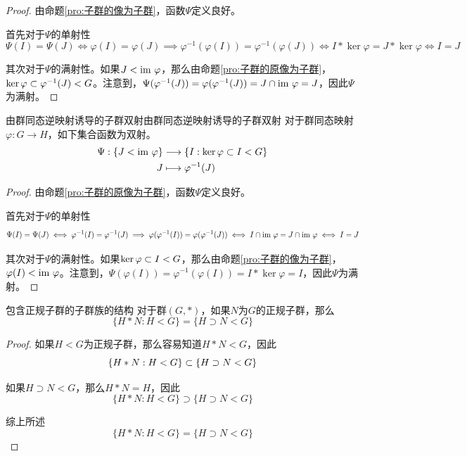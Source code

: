 \begin{proof}
	由命题\ref{pro:子群的像为子群}，函数$\Psi$定义良好。
	
	首先对于$\Psi$的单射性
	$$
	\Psi(I)=\Psi(J)
	\iff \varphi(I)=\varphi(J)
	\implies \varphi^{-1}(\varphi(I))=\varphi^{-1}(\varphi(J))
	\iff I*\ker\varphi=J*\ker\varphi
	\iff I=J
	$$
	
	其次对于$\Psi$的满射性。如果$J<\text{im } \varphi$，那么由命题\ref{pro:子群的原像为子群}，$\ker\varphi\subset \varphi^{-1}(J)<G$。注意到，$\Psi(\varphi^{-1}(J))=\varphi(\varphi^{-1}(J))=J\cap\text{im } \varphi=J$，因此$\Psi$为满射。
\end{proof}

\begin{proposition}{由群同态逆映射诱导的子群双射}{由群同态逆映射诱导的子群双射}
	对于群同态映射$\varphi:G\to H$，如下集合函数为双射。
	\begin{align*}
		\Psi:\begin{aligned}[t]
			\{ J<\text{im } \varphi \}&\longrightarrow \{ I:\ker\varphi\subset I<G \}\\
			J&\longmapsto \varphi^{-1}(J)
		\end{aligned}
	\end{align*}
\end{proposition}

\begin{proof}
	由命题\ref{pro:子群的原像为子群}，函数$\Psi$定义良好。
	
	首先对于$\Psi$的单射性
	$$
	\Psi(I)=\Psi(J)
	\iff \varphi^{-1}(I)=\varphi^{-1}(J)
	\implies \varphi(\varphi^{-1}(I))=\varphi(\varphi^{-1}(J))
	\iff I\cap\text{im } \varphi=J\cap\text{im } \varphi
	\iff I=J
	$$
	
	其次对于$\Psi$的满射性。如果$\ker\varphi\subset I<G$，那么由命题\ref{pro:子群的像为子群}，$\varphi(I)<\text{im } \varphi$。注意到，$\Psi(\varphi(I))=\varphi^{-1}(\varphi(I))=I*\ker\varphi=I$，因此$\Psi$为满射。
\end{proof}

\begin{proposition}{}{包含正规子群的子群族的结构}
	对于群$(G,*)$，如果$N$为$G$的正规子群，那么
	$$
	\{ H*N:H<G\}=\{ H\supset N<G\}
	$$
\end{proposition}

\begin{proof}
	如果$H<G$为正规子群，那么容易知道$H*N<G$，因此
	$$
	\{ H*N:H<G\}\subset\{ H\supset N<G\}
	$$
	
	如果$H\supset N<G$，那么$H*N=H$，因此
	$$
	\{ H*N:H<G\}\supset\{ H\supset N<G\}
	$$
	
	综上所述
	$$
	\{ H*N:H<G\}=\{ H\supset N<G\}
	$$
\end{proof}

